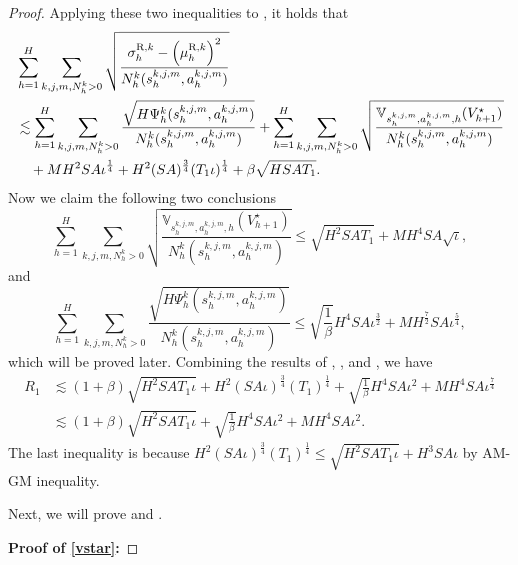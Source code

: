 \documentclass{article}
\newcommand{\R}{\textnormal{R}}
\begin{document}
\begin{proof}
Applying these two inequalities to , it holds that
\begin{align}
 &\sum_{h=1}^H\sum_{k,j,m,N_h^k >0}\sqrt{\frac{\sigma_h^{\R,k} - \left(\mu_h^{\R,k}\right)^2}{N_h^k(s_h^{k,j,m}, a_h^{k,j,m})}} \nonumber\\
 &\lesssim \sum_{h=1}^H\sum_{k,j,m,N_h^k >0}\frac{\sqrt{H\Psi_h^k(s_h^{k,j,m}, a_h^{k,j,m})}}{N_h^k(s_h^{k,j,m}, a_h^{k,j,m})} + \sum_{h=1}^H\sum_{k,j,m,N_h^k >0}\sqrt{\frac{\mathbb{V}_{s_h^{k,j,m}, a_h^{k,j,m}, h} (V_{h+1}^{\star})}{N_h^k(s_h^{k,j,m}, a_h^{k,j,m})}}\nonumber\\
 &\quad+  MH^2SA\iota^{\frac{1}{4}} + H^2(SA)^{\frac{3}{4}}(T_1\iota)^{\frac{1}{4}} + \beta \sqrt{HSAT_1}. \label{refupper}
\end{align}
Now we claim the following two conclusions
\begin{equation}
    \label{vstar}
    \sum_{h=1}^H\sum_{k,j,m,N_h^k >0}\sqrt{\frac{\mathbb{V}_{s_h^{k,j,m}, a_h^{k,j,m}, h} (V_{h+1}^{\star})}{N_h^k(s_h^{k,j,m}, a_h^{k,j,m})}} \leq \sqrt{H^2SAT_1}+MH^4SA\sqrt{\iota},
\end{equation}
and
\begin{equation}
    \label{sumpsi}
    \sum_{h=1}^H\sum_{k,j,m,N_h^k >0}\frac{\sqrt{H\Psi_h^k(s_h^{k,j,m}, a_h^{k,j,m})}}{N_h^k(s_h^{k,j,m}, a_h^{k,j,m})} \leq \sqrt{\frac{1}{\beta}}H^4SA\iota^{\frac{3}{2}}+M H^{\frac{7}{2}}SA\iota^{\frac{5}{4}},
\end{equation}
which will be proved later. Combining the results of , ,  and , we have
\begin{align*}
    R_1 &\lesssim (1+\beta) \sqrt{H^2SAT_1\iota} + H^2(SA\iota)^{\frac{3}{4}}(T_1)^{\frac{1}{4}} +\sqrt{\frac{1}{\beta}}H^4SA\iota^2+ MH^{4}SA\iota^{\frac{7}{4}} \nonumber\\
    &\lesssim  (1+\beta) \sqrt{H^2SAT_1\iota} + \sqrt{\frac{1}{\beta}}H^4SA\iota^2+MH^4SA\iota^2.
\end{align*}
The last inequality is because
$H^2(SA\iota)^{\frac{3}{4}}(T_1)^{\frac{1}{4}} \leq \sqrt{H^2SAT_1\iota}+H^3SA\iota$
by AM-GM inequality. 

Next, we will prove  and .

\textbf{Proof of \cref{vstar}:}


\end{proof}
\end{document}
